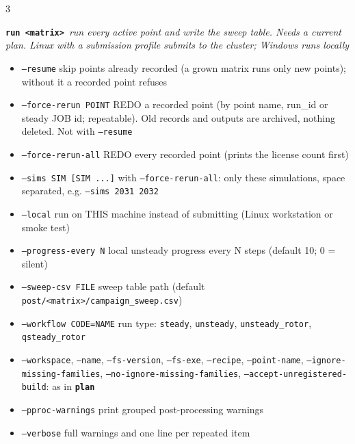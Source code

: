 \documentclass[a4paper,landscape]{article}
\newcommand{\fl}[1]{\textcolor{flag}{\texttt{#1}}}
\newcommand{\cmd}[1]{\textcolor{acc}{\textbf{\texttt{#1}}}}
\newcommand{\stage}[1]{\vspace{1.2pt}{\color{white}\colorbox{acc}{\parbox{\dimexpr\linewidth-2\fboxsep}{\raggedright\bfseries\scriptsize #1}}}\par\vspace{0.6pt}}
\newenvironment{flags}{\begin{itemize}[leftmargin=2.2mm,itemsep=-0.4pt,topsep=0pt,parsep=0pt,label={\tiny$\bullet$}]}{\end{itemize}}
\newcommand{\sub}[2]{\vspace{1.4pt}\cmd{#1}\ {\itshape #2}\par}
\begin{document}
\begin{multicols}{3}
\columnbreak
\stage{3. RUN}
\sub{run <matrix>}{run every active point and write the sweep table. Needs a current plan. Linux with a submission profile submits to the cluster; Windows runs locally}
\begin{flags}
\item \fl{--resume} skip points already recorded (a grown matrix runs only new points); without it a recorded point refuses
\item \fl{--force-rerun POINT} REDO a recorded point (by point name, run\_id or steady JOB id; repeatable). Old records and outputs are archived, nothing deleted. Not with \fl{--resume}
\item \fl{--force-rerun-all} REDO every recorded point (prints the license count first)
\item \fl{--sims SIM [SIM ...]} with \fl{--force-rerun-all}: only these simulations, space separated, e.g. \texttt{--sims 2031 2032}
\item \fl{--local} run on THIS machine instead of submitting (Linux workstation or smoke test)
\item \fl{--progress-every N} local unsteady progress every N steps (default 10; 0 = silent)
\item \fl{--sweep-csv FILE} sweep table path (default \texttt{post/<matrix>/campaign\_sweep.csv})
\item \fl{--workflow CODE=NAME} run type: \texttt{steady}, \texttt{unsteady}, \texttt{unsteady\_rotor}, \texttt{qsteady\_rotor}
\item \fl{--workspace}, \fl{--name}, \fl{--fs-version}, \fl{--fs-exe}, \fl{--recipe}, \fl{--point-name}, \fl{--ignore-missing-families}, \fl{--no-ignore-missing-families}, \fl{--accept-unregistered-build}: as in \cmd{plan}
\item \fl{--pproc-warnings} print grouped post-processing warnings
\item \fl{--verbose} full warnings and one line per repeated item
\end{flags}


\end{multicols}
\end{document}
